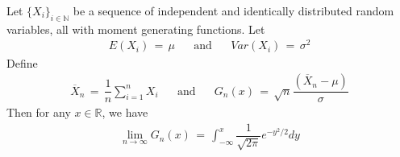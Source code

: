 \begin{theorem}
    Let $\{X_{i}\}_{i \in \mathbb{N}}$ be a sequence of independent and identically distributed random variables, all with moment generating functions. Let
    \begin{align*}
        E(X_{i}) \hspace{2pt} = \hspace{2pt} \mu \hspace{20pt} \text{and} \hspace{20pt} Var(X_{i}) \hspace{2pt} = \hspace{2pt} \sigma^{2}
    \end{align*}
    Define 
    \begin{align*}
        \overline{X}_{n} \hspace{2pt} = \hspace{2pt} \dfrac{1}{n} \sum_{i = 1}^{n} X_{i} \hspace{20pt} \text{and} \hspace{20pt} G_{n}(x) \hspace{2pt} = \hspace{2pt} \sqrt{n}\dfrac{(\overline{X}_{n} - \mu)}{\sigma}
    \end{align*}
    Then for any $x \in \mathbb{R}$, we have
    \begin{align*}
        \lim_{n \longrightarrow \infty} G_{n}(x) \hspace{2pt} = \hspace{2pt} \int_{-\infty}^{x} \dfrac{1}{\sqrt{2 \pi}} e^{-y^{2}/2} dy
    \end{align*}
\end{theorem}